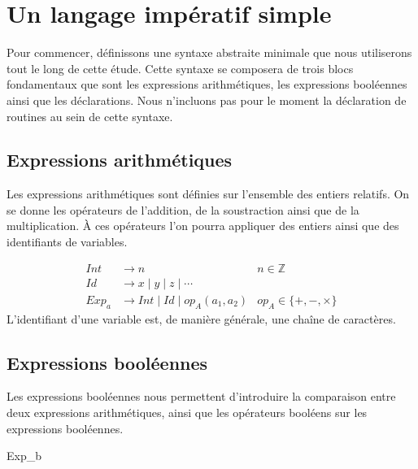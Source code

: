 \section{Un langage impératif simple}
Pour commencer, définissons une syntaxe abstraite minimale que nous utiliserons tout le long de cette étude. 
Cette syntaxe se composera de trois blocs fondamentaux que sont les expressions arithmétiques, les expressions 
booléennes ainsi que les déclarations. Nous n'incluons pas pour le moment la déclaration de routines au sein de cette syntaxe.

\subsection{Expressions arithmétiques}
Les expressions arithmétiques sont définies sur l'ensemble des entiers relatifs. On se donne les opérateurs 
de l'addition, de la soustraction ainsi que de la multiplication. À ces opérateurs l'on pourra appliquer des 
entiers ainsi que des identifiants de variables.


\begin{align*}
Int &\rightarrow n &n \in \mathbb{Z}\\
Id &\rightarrow x \mid y \mid z \mid \cdots \\
Exp_a &\rightarrow Int \mid Id \mid op_A(a_1, a_2) &op_A \in \{+, -, \times\}
\end{align*}
L'identifiant d'une variable est, de manière générale, une chaîne de caractères.

\subsection{Expressions booléennes}
Les expressions booléennes nous permettent d'introduire la comparaison entre deux expressions arithmétiques, 
ainsi que les opérateurs booléens sur les expressions booléennes.

\begin{dtype}{Exp_b}
  \\
\end{dtype}

